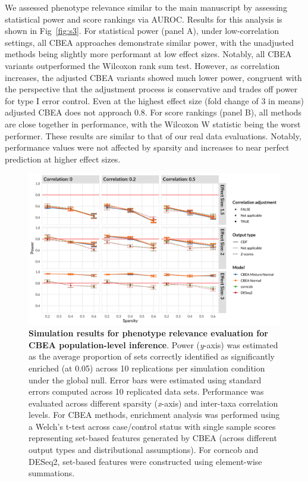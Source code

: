 \documentclass{article}
\begin{document}
We assessed phenotype relevance similar to the main manuscript by assessing statistical power and score rankings via AUROC. Results for this analysis is shown in Fig~\ref{fig:s3}. For statistical power (panel A), under low-correlation settings, all CBEA approaches demonstrate similar power, with the unadjusted methods being slightly more performant at low effect sizes. Notably, all CBEA variants outperformed the Wilcoxon rank sum test. However, as correlation increases, the adjusted CBEA variants showed much lower power, congruent with the perspective that the adjustment process is conservative and trades off power for type I error control. Even at the highest effect size (fold change of 3 in means) adjusted CBEA does not approach 0.8. For score rankings (panel B), all methods are close together in performance, with the Wilcoxon W statistic being the worst performer. These results are similar to that of our real data evaluations. Notably, performance values were not affected by sparsity and increases to near perfect prediction at higher effect sizes.  
\begin{figure}[!h]
    \centering
    \includegraphics[width = \textwidth]{figures/sim_diffab_pwr.png}
    \caption{\textbf{Simulation results for phenotype relevance evaluation for CBEA population-level inference}. Power (\emph{y}-axis) was estimated as the average proportion of sets correctly identified as significantly enriched (at 0.05) across 10 replications per simulation condition under the global null. Error bars were estimated using standard errors computed across 10 replicated data sets. Performance was evaluated across different sparsity (\emph{x}-axis) and inter-taxa correlation levels. For CBEA methods, enrichment analysis was performed using a Welch's t-test across case/control status with single sample scores representing set-based features generated by CBEA (across different output types and distributional assumptions). For corncob and DESeq2, set-based features were constructed using element-wise summations.} 
    \label{fig:s4}
\end{figure}
\end{document}
